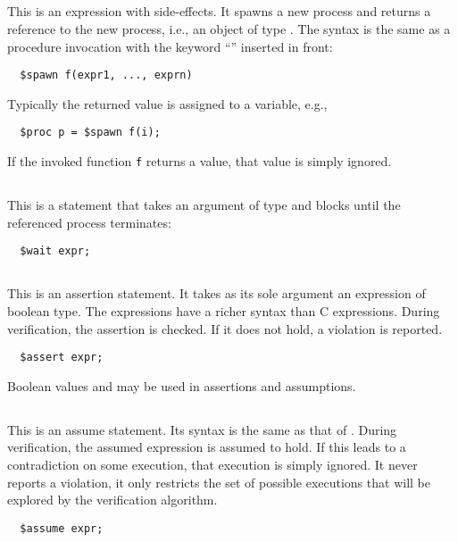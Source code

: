 \documentclass[11pt]{book}
\begin{document}
\subsection{\cspawn} This is an expression with side-effects.  It
spawns a new process and returns a reference to the new process, i.e.,
an object of type \cproc.  The syntax is the same as a procedure
invocation with the keyword ``\cspawn'' inserted in front:
\begin{verbatim}
  $spawn f(expr1, ..., exprn)
\end{verbatim}
Typically the returned value is assigned to a variable, e.g.,
\begin{verbatim}
  $proc p = $spawn f(i);
\end{verbatim}
If the invoked function \texttt{f} returns a value, that value is
simply ignored.

\subsection{\cwait} This is a statement that takes an argument of type
\cproc{} and blocks until the referenced process terminates:
\begin{verbatim}
  $wait expr;
\end{verbatim}

\subsection{\cassert} This is an assertion statement.  It takes as its
sole argument an expression of boolean type.  The expressions have a
richer syntax than C expressions.  During verification, the assertion
is checked.  If it does not hold, a violation is reported.
\begin{verbatim}
  $assert expr;
\end{verbatim}
Boolean values \ctrue{} and \cfalse{} may be used in assertions
and assumptions.

\subsection{\cassume} This is an assume statement. Its syntax is the
same as that of \cassert.  During verification, the assumed expression
is assumed to hold.  If this leads to a contradiction on some
execution, that execution is simply ignored.  It never reports a
violation, it only restricts the set of possible executions that will
be explored by the verification algorithm.
\begin{verbatim}
  $assume expr;
\end{verbatim}
\end{document}
